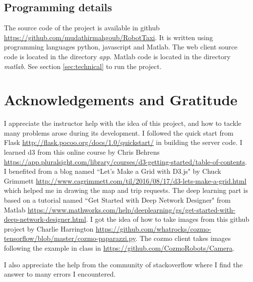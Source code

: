 \documentclass[12pt,a4paper]{article}
\begin{document}
\subsection{Programming details}

The source code of the project is available in github \url{https://github.com/mudathirmahgoub/RobotTaxi}. It is written using programming languages python, javascript and Matlab. The web client source code is located in the directory \textit{app}. Matlab code is located in the directory \textit{matlab}. 
See section \ref{sec:technical} to run the project. 

\section{Acknowledgements and Gratitude}

I appreciate the instructor help  with the idea of this project, and how to tackle many problems arose during its development. I followed the quick start from Flask \url{http://flask.pocoo.org/docs/1.0/quickstart/} in building the server code. I learned d3 from this online course by Chris Behrens \\ \url{https://app.pluralsight.com/library/courses/d3-getting-started/table-of-contents}. I benefited  from a blog named ``Let's Make a Grid with D3.js" by Chuck Grimmett \url{http://www.cagrimmett.com/til/2016/08/17/d3-lets-make-a-grid.html} which helped me in drawing the map and trip requests. The deep learning part is based on a tutorial named ``Get Started with Deep Network Designer" from Matlab \url{https://www.mathworks.com/help/deeplearning/gs/get-started-with-deep-network-designer.html}. I got the idea of how to take images from this github project by Charlie Harrington \url{https://github.com/whatrocks/cozmo-tensorflow/blob/master/cozmo-paparazzi.py}. The cozmo client takes images following the example in class in \url{https://github.com/CozmoRobots/Camera}. 

I also appreciate the help from the community of stackoverflow where I find the answer to many errors I encountered. 





\end{document}

